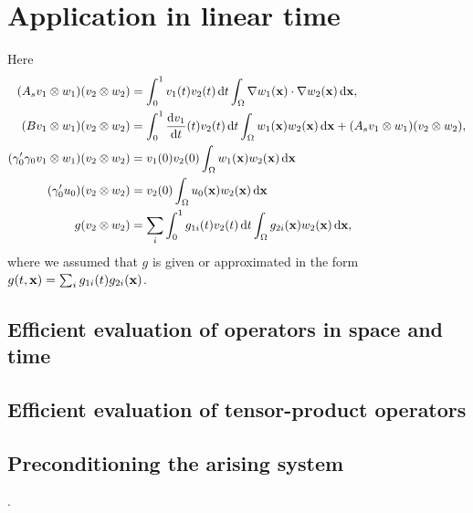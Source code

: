 \documentclass[11pt,a4paper,oneside,english]{amsart}
\numberwithin{equation}{section}
\numberwithin{theorem}{section}
\theoremstyle{definition}
\newcommand{\jw}[1]{{\color{red}{JW: #1}}}
\begin{document}
\section{Application in linear time}
\jw{XYZ inleiding.}

Here
\begin{align*}
(A_s v_1 \otimes w_1)(v_2 \otimes w_2)&=\int_0^1 v_1(t) v_2(t)\dif t \int_\Omega \nabla w_1({\bf x})\cdot  \nabla w_2({\bf x}) \dif{\bf x},\\
(B v_1 \otimes w_1)(v_2 \otimes w_2)&=\int_0^1 \frac{\dif v_1}{\dif t}(t) v_2(t)\dif t \int_\Omega w_1({\bf x}) w_2({\bf x}) \dif {\bf x}+(A_s v_1 \otimes w_1)(v_2 \otimes w_2),\\
(\gamma_0' \gamma_0 v_1 \otimes w_1)(v_2 \otimes w_2)&=
v_1(0) v_2(0)\int_\Omega w_1({\bf x}) w_2({\bf x}) \dif {\bf x}\\
(\gamma_0' u_0)(v_2 \otimes w_2)&=v_2(0) \int_\Omega u_0({\bf x}) w_2({\bf x}) \dif {\bf x}\\
g(v_2 \otimes w_2)&=\sum_i \int_0^1g_{1i}(t) v_2(t)\dif t \int_\Omega g_{2i}({\bf x}) w_2({\bf x}) \dif  {\bf x},
\end{align*}
where we assumed that $g$ is given or approximated in the form $g(t,{\bf x})=\sum_i g_{1i}(t) g_{2i}({\bf x})$.


\subsection{Efficient evaluation of operators in space and time}
\jw{willen we hier de sectie uit followup copy-pasten of is een referentie naar nicos' phd of dat paper met kestler voldoende?}
\subsection{Efficient evaluation of tensor-product operators}
\jw{willen we hier de sectie uit followup copy-pasten of is een referentie naar nicos' phd of dat paper met kestler voldoende?}

\subsection{Preconditioning the arising system}
\jw{introduce operator preconditioning}. \jw{onze norm-inducing bilinear forms lijken wat op die van [arXiv:1212.6037]. Maar onze $D_X$-operator is mooier, door dat inzicht van [PW12]}
\end{document}
